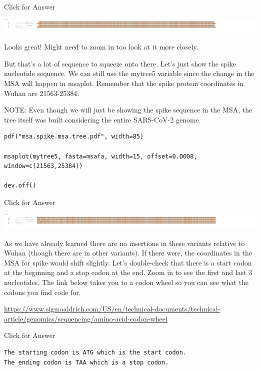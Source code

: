 \documentclass[
]{book}
\begin{document}
Click for Answer

\includegraphics[width=1\textwidth,height=\textheight]{./Figures/msa.big.tree.png}

\hfill\break

Looks great! Might need to zoom in too look at it more closely.

But that's a lot of sequence to squeeze onto there. Let's just show the spike nucleotide sequence. We can still use the mytree5 variable since the change in the MSA will happen in msaplot. Remember that the spike protein coordinates in Wuhan are 21563-25384.

NOTE: Even though we will just be showing the spike sequence in the MSA, the tree itself was built considering the entire SARS-CoV-2 genome.

\begin{verbatim}
pdf("msa.spike.msa.tree.pdf", width=85)

msaplot(mytree5, fasta=msafa, width=15, offset=0.0008, window=c(21563,25384))

dev.off()
\end{verbatim}

Click for Answer

\includegraphics[width=1\textwidth,height=\textheight]{./Figures/msa.spike.msa.tree.png}

\hfill\break

As we have already learned there are no insertions in these variants relative to Wuhan (though there are in other variants). If there were, the coordinates in the MSA for spike would shift slightly. Let's double-check that there is a start codon at the beginning and a stop codon at the end. Zoom in to see the first and last 3 nucleotides. The link below takes you to a codon wheel so you can see what the codons you find code for.

\url{https://www.sigmaaldrich.com/US/en/technical-documents/technical-article/genomics/sequencing/amino-acid-codon-wheel}

Click for Answer

\begin{verbatim}
The starting codon is ATG which is the start codon.
The ending codon is TAA which is a stop codon.
\end{verbatim}
\end{document}
